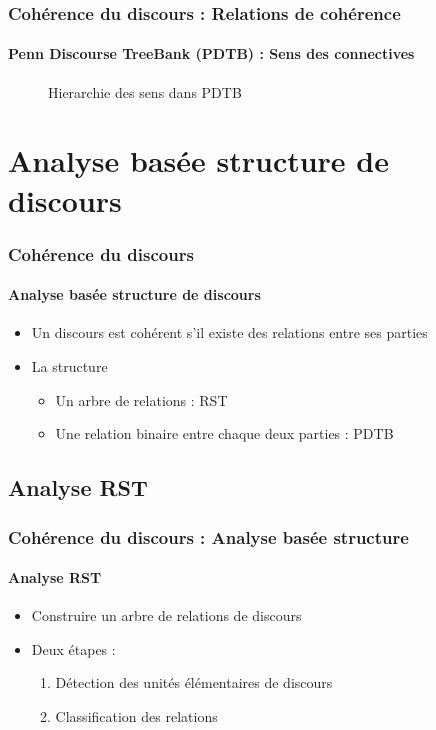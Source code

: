 \documentclass[xcolor=table]{beamer}
\begin{document}
\begin{frame}
	\frametitle{Cohérence du discours : Relations de cohérence}
	\framesubtitle{Penn Discourse TreeBank (PDTB) : Sens des connectives}
	
	\begin{figure}
		\caption{Hierarchie des sens dans PDTB \cite{2008-prasad-al}}
	\end{figure}
	
\end{frame}

\section{Analyse basée structure de discours}

\begin{frame}
	\frametitle{Cohérence du discours}
	\framesubtitle{Analyse basée structure de discours}
	
	\begin{itemize}
		\item Un discours est cohérent s'il existe des relations entre ses parties
		\item La structure
		\begin{itemize}
			\item Un arbre de relations : RST
			\item Une relation binaire entre chaque deux parties : PDTB
		\end{itemize}
	\end{itemize}
	
\end{frame}

\subsection{Analyse RST}

\begin{frame}
	\frametitle{Cohérence du discours : Analyse basée structure}
	\framesubtitle{Analyse RST}
	
	\begin{itemize}
		\item Construire un arbre de relations de discours
		\item Deux étapes : 
		\begin{enumerate}
			\item Détection des unités élémentaires de discours
			\item Classification des relations
		\end{enumerate}
	\end{itemize}

	\begin{center}
	\end{center}
	
\end{frame}
\end{document}
